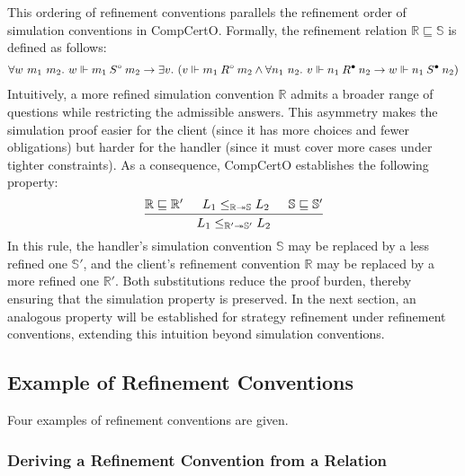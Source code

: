 This ordering of refinement conventions
parallels the refinement order of simulation conventions
in CompCertO.
Formally,
the refinement relation $\mathbb{R} \sqsubseteq \mathbb{S}$ is defined as follows:
\begin{align*}
  \forall w\ m_1\ m_2.\ w \Vdash m_1 \mathbin{S^\circ} m_2
  \rightarrow \exists v.\ (v \Vdash m_1 \mathbin{R^\circ} m_2 \wedge
    \forall n_1\ n_2.\ v \Vdash n_1 \mathbin{R^\bullet} n_2 \rightarrow
  w \Vdash n_1 \mathbin{S^\bullet} n_2)
\end{align*}
Intuitively,
a more refined simulation convention $\mathbb{R}$
admits a broader range of questions
while restricting the admissible answers.
This asymmetry makes the simulation proof easier
for the client
(since it has more choices and fewer obligations)
but harder for the handler
(since it must cover more cases under tighter constraints).
As a consequence, CompCertO establishes the following property:
\begin{equation}\label{eq:convention-ordering}
  \begin{prooftree}
    \hypo{\mathbb{R} \sqsubseteq \mathbb{R}'}
    \hypo{L_1 \le_\kw{\mathbb{R} \twoheadrightarrow \mathbb{S}} L_2}
    \hypo{\mathbb{S} \sqsubseteq \mathbb{S}'}
    \infer3{L_1 \le_\kw{\mathbb{R'} \twoheadrightarrow \mathbb{S'}} L_2}
  \end{prooftree}
\end{equation}
In this rule, the handler's simulation convention $\mathbb{S}$
may be replaced by a less refined one $\mathbb{S}'$,
and the client's refinement convention $\mathbb{R}$
may be replaced by a more refined one $\mathbb{R}'$.
Both substitutions reduce the proof burden,
thereby ensuring that the simulation property is preserved.
In the next section,
an analogous property will be established
for strategy refinement under refinement conventions,
extending this intuition beyond simulation conventions.

\subsection{Example of Refinement Conventions}

Four examples of refinement conventions are given.

\subsubsection{Deriving a Refinement Convention from a Relation}

